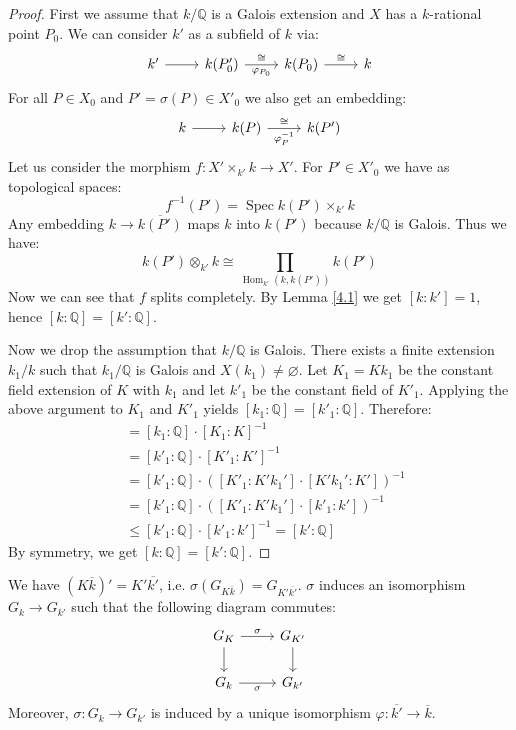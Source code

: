 \begin{proof}
First we assume that $k/\mathbb{Q}$ is a Galois extension and $X$ has a $k$-rational point $P_0$. We can consider $k'$ as a subfield of $k$ via: 
\[\begin{tikzcd}
k'\ar[r] & k(P'_0)\ar[r, "\varphi_{P_0}"', "\cong"] & k(P_0) \ar[r, "\cong"] & k
\end{tikzcd}\]
For all $P\in X_0$ and $P'=\sigma(P)\in X'_0$ we also get an embedding:
\[ \begin{tikzcd}
k \ar[r] & k(P) \ar[r, "\varphi_P^{-1}"', "\cong"] & k(P')
\end{tikzcd} \]
Let us consider the morphism $f:X'\times_{k'} k\to X'$. For $P'\in X'_0$ we have as topological spaces:
\[ f^{-1}(P') = \operatorname{Spec} k(P')\times_{k'} k \]
Any embedding $k\to \overline{k(P')}$ maps $k$ into $k(P')$ because $k/\mathbb{Q}$ is Galois. Thus we have:
\[ k(P')\otimes_{k'} k\cong \prod_{\operatorname{Hom}_{k'}(k, k(P'))} k(P') \]
Now we can see that $f$ splits completely. By Lemma \ref{4.1} we get $[k:k'] = 1$, hence $[k:\mathbb{Q}]= [k':\mathbb{Q}]$.

Now we drop the assumption that $k/\mathbb{Q}$ is Galois. There exists a finite extension $k_1/k$ such that $k_1/\mathbb{Q}$ is Galois and $X(k_1)\neq\varnothing$. Let $K_1 = Kk_1$ be the constant field extension of $K$ with $k_1$ and let $k'_1$ be the constant field of $K'_1$. Applying the above argument to $K_1$ and $K'_1$ yields $[k_1:\mathbb{Q}] = [k'_1:\mathbb{Q}]$. Therefore:
\begin{align*}
[k:\mathbb{Q}] &= [k_1:\mathbb{Q}]\cdot [K_1:K]^{-1} \\
&= [k'_1:\mathbb{Q}]\cdot [K'_1:K']^{-1}\\
&= [k'_1:\mathbb{Q}]\cdot ([K'_1: K'k_1'] \cdot [K'k_1':K'])^{-1}\\
&= [k'_1:\mathbb{Q}]\cdot  ([K'_1: K'k_1'] \cdot [k'_1:k'])^{-1} \\
&\leq [k'_1:\mathbb{Q}]\cdot [k'_1:k']^{-1} = [k':\mathbb{Q}]
\end{align*}
By symmetry, we get $[k:\mathbb{Q}] = [k':\mathbb{Q}]$.
\end{proof}

\begin{lemma}\label{4.2}
We have $(K\overline{k})'=K'\overline{k'}$, i.e. $\sigma(G_{K\overline{k}})=G_{K'\overline{k'}}$. $\sigma$ induces an isomorphism $G_k\to G_{k'}$ such that the following diagram commutes:
\[ \begin{tikzcd}
G_K \ar[r, "\sigma"] \ar[d] & G_{K'}\ar[d]\\
G_k \ar[r, "\sigma"'] & G_{k'}
\end{tikzcd} \]
Moreover, $\sigma:G_k\to G_{k'}$ is induced by a unique isomorphism $\varphi:\overline{k'}\to\overline{k}$.
\end{lemma}

